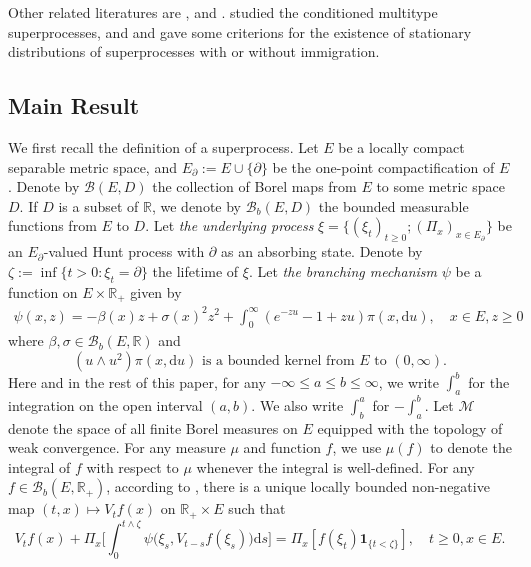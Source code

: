 \documentclass[12pt,a4paper]{amsart}
\numberwithin{equation}{section}
\theoremstyle{plain}
\theoremstyle{definition}
\theoremstyle{remark}
\begin{document}
Other related literatures are   \cite{ChampagnatRoelly2008Limit}, \cite{Li20} and \cite{Sta}. \cite{ChampagnatRoelly2008Limit} studied the conditioned multitype  superprocesses, and  \cite{Li20} and \cite{Sta} gave some criterions for the existence of stationary distributions of superprocesses 
with or without immigration.

\subsection{Main Result}\label{sec:M}
	 We first recall the definition of a superprocess.
	Let $E$ be a locally compact separable metric space, and $E_\partial := E \cup \{\partial\}$ be the one-point compactification of $E$.
	Denote by $\mathcal B(E, D)$ the collection of Borel maps  from $E$ to some metric space $D$.
	If $D$ is a subset of $\mathbb R$, we denote by $\mathcal B_b(E,D)$ the bounded measurable functions from $E$ to $D$.
	Let \emph{the underlying process}
	$\xi = \{(\xi_t)_{t\ge0}; (\Pi_x)_{x\in E_\partial}\}$
	 be an $E_\partial$-valued Hunt process with $\partial$ as an absorbing state.
	Denote by $\zeta:=\inf\{t>0: \xi_t=\partial\}$ the lifetime of $\xi$.
	Let \emph{the branching mechanism} $\psi$ be a function on $E \times \mathbb R_+$ given by
\begin{align}
	\psi(x,z)
	= -\beta(x) z + \sigma(x)^2 z^2 + \int_0^\infty (e^{-zu} -1 + zu) \pi(x,{\mathrm d}u),
	\quad x\in E, z\geq 0
\end{align}
	where $\beta, \sigma \in \mathcal B_b(E,\mathbb R)$ and
\begin{equation} \label{eq:M.01}
	\text{$(u \wedge u^2) \pi(x,{\mathrm d}u)$ is a bounded kernel from $E$ to $(0,\infty)$.}
\end{equation}
	Here and in the rest of this paper, for any $-\infty \leq a \leq b \leq \infty$, we write $\int_a^b$ for the integration on the open interval $(a,b)$.
	We also write $\int_b^a$ for $- \int_a^b$.
	Let $\mathcal M$ denote the space of all finite Borel measures on $E$ equipped with the topology of weak convergence.
		For any measure $\mu$ and function $f$, we use $\mu(f)$ to denote the integral of $f$ with respect to $\mu$ whenever the integral is well-defined.
		For any $f \in \mathcal B_b(E,\mathbb R_+)$, according to \cite[Proposition 2.20]{Li2011Measure-valued}, there is a unique locally bounded non-negative map $(t,x)\mapsto V_tf(x)$ on $\mathbb R_+\times E$ such that
\begin{equation} \label{eq:M.1}
	V_tf(x) + \Pi_x\Big[\int_0^{t\wedge \zeta} \psi\big(\xi_s, V_{t-s} f(\xi_s)\big) {\mathrm d}s\Big] = \Pi_x[f(\xi_t) \mathbf 1_{\{t< \zeta\}}], \quad t\geq 0, x\in E.
\end{equation}
\end{document}
